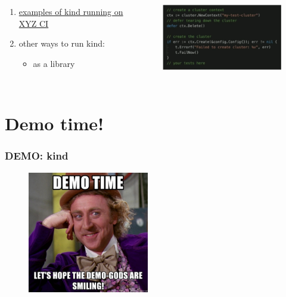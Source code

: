 \documentclass[default]{beamer}
\begin{document}
\begin{frame}
  \begin{columns}
    \column{2in}
    \begin{enumerate}
      \item \href{https://github.com/kind-ci/examples}{examples of kind running on XYZ CI}
      \item other ways to run kind:
      \begin{itemize}
        \item as a library
      \end{itemize}
    \end{enumerate}
    \column{2in}
    \begin{figure}
      \includegraphics[width=190pt,height=100pt]{static/kind2.png}
    \end{figure}
  \end{columns}
\end{frame}

\section{Demo time!}


\begin{frame}
  \frametitle{DEMO: kind}
  \begin{figure}
    \includegraphics[width=150pt,height=150pt]{static/demo.jpg}
  \end{figure}
\end{frame}
\end{document}
